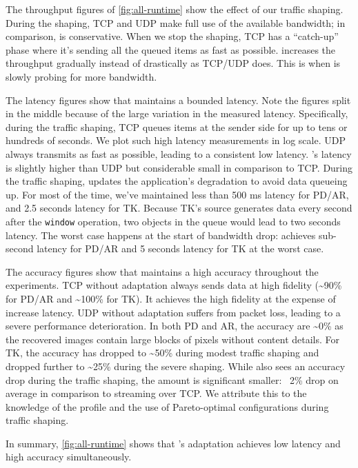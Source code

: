 The throughput figures of \autoref{fig:all-runtime} show the effect of our
traffic shaping. During the shaping, TCP and UDP make full use of the available
bandwidth; in comparison, \sysname{} is conservative. When we stop the shaping,
TCP has a ``catch-up'' phase where it's sending all the queued items as fast as
possible. \sysname{} increases the throughput gradually instead of drastically
as TCP/UDP does. This is when \sysname{} is slowly probing for more bandwidth.

The latency figures show that \sysname{} maintains a bounded latency. Note the
figures split in the middle because of the large variation in the measured
latency. Specifically, during the traffic shaping, TCP queues items at the
sender side for up to tens or hundreds of seconds. We plot such high latency
measurements in log scale. UDP always transmits as fast as possible, leading to
a consistent low latency. \sysname{}'s latency is slightly higher than UDP but
considerable small in comparison to TCP\@. During the traffic shaping,
\sysname{} updates the application's degradation to avoid data queueing up. For
most of the time, we've maintained less than 500 ms latency for PD/AR, and 2.5
seconds latency for TK\@. Because TK's source generates data every second after
the \texttt{window} operation, two objects in the queue would lead to two
seconds latency. The worst case happens at the start of bandwidth
drop: \sysname{} achieves sub-second latency for PD/AR and 5 seconds latency for
TK at the worst case.

The accuracy figures show that \sysname{} maintains a high accuracy throughout
the experiments. TCP without adaptation always sends data at high fidelity
(\textasciitilde 90\% for PD/AR and \textasciitilde 100\% for TK). It achieves
the high fidelity at the expense of increase latency. UDP without adaptation
suffers from packet loss, leading to a severe performance deterioration.  In
both PD and AR, the accuracy are \textasciitilde 0\% as the recovered images
contain large blocks of pixels without content details. For TK, the accuracy has
dropped to \textasciitilde 50\% during modest traffic shaping and dropped
further to \textasciitilde 25\% during the severe shaping. While \sysname{} also
sees an accuracy drop during the traffic shaping, the amount is significant
smaller: ~2\% drop on average in comparison to streaming over TCP.
We attribute this to the knowledge of the profile and the use of Pareto-optimal configurations during traffic shaping.

In summary, \autoref{fig:all-runtime} shows that \sysname{}'s adaptation achieves
low latency and high accuracy simultaneously.

